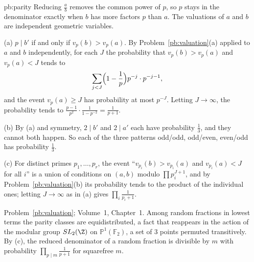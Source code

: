 \begin{solution}{pb:parity}
\idea Reducing $\frac ab$ removes the common power of $p$, so $p$ stays in the denominator exactly when $b$ has more factors $p$
than $a$. The valuations of $a$ and $b$ are independent geometric variables.

\writeup (a) $p\mid b'$ if and only if $v_p(b)>v_p(a)$. By Problem~\ref{pb:valuation}(a) applied to $a$ and $b$ independently, for
each $J$ the probability that $v_p(b)>v_p(a)$ and $v_p(a)<J$ tends to
\[
\sum_{j<J}\Bigl(1-\frac1p\Bigr)p^{-j}\cdot p^{-j-1},
\]
and the event $v_p(a)\ge J$ has probability at most $p^{-J}$. Letting $J\to\infty$, the probability tends to
$\frac{p-1}{p^2}\cdot\frac1{1-p^{-2}}=\frac1{p+1}$.

(b) By (a) and symmetry, $2\mid b'$ and $2\mid a'$ each have probability $\frac13$, and they cannot both happen. So each of the
three patterns odd/odd, odd/even, even/odd has probability $\frac13$.

(c) For distinct primes $p_1,\dots,p_r$, the event ``$v_{p_i}(b)>v_{p_i}(a)$ and $v_{p_i}(a)<J$ for all $i$'' is a union of
conditions on $(a,b)$ modulo $\prod p_i^{J+1}$, and by Problem~\ref{pb:valuation}(b) its probability tends to the product of the
individual ones; letting $J\to\infty$ as in (a) gives $\prod_i\frac1{p_i+1}$.

\tools Problem~\ref{pb:valuation}; Volume~1, Chapter~1.
\leads Among random fractions in lowest terms the parity classes are equidistributed, a fact that reappears in the action of the
modular group $SL_2(\Z)$ on $\mathbb P^1(\mathbb F_2)$, a set of $3$ points permuted transitively. By (c), the reduced denominator
of a random fraction is divisible by $m$ with probability $\prod_{p\mid m}\frac1{p+1}$ for squarefree $m$.
\end{solution}

